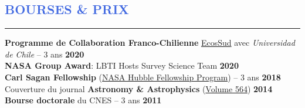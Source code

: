 \documentclass[11pt, a4paper, french]{article}
\begin{document}

\vspace{-0.3cm}
\textcolor{RoyalBlue}{\section{\large BOURSES \& PRIX}
\vspace{-0.2cm}\hrule}
\vspace{0.4cm}

\textbf{Programme de Collaboration Franco-Chilienne} \href{https://www.univ-paris13.fr/ecos-sud/}{EcosSud} avec {\it Universidad de Chile} -- 3 ans \hfill   \textbf{2020}\\ %

\vspace{-0.15cm}
\textbf{NASA Group Award}: LBTI Hosts Survey Science Team \hfill   \textbf{2020}\\ 

\vspace{-0.15cm}
\textbf{Carl Sagan Fellowship} (\href{http://www.stsci.edu/stsci-research/fellowships/nasa-hubble-fellowship-program}{NASA Hubble Fellowship Program}) -- 3 ans \hfill   { \bf 2018}\\

\vspace{-0.15cm}
Couverture du journal \textbf{Astronomy \& Astrophysics} (\href{https://www.aanda.org/articles/aa/abs/2014/04/contents/contents.html}{Volume 564}) \hfill  { \bf 2014}\\


\vspace{-0.15cm}
\textbf{Bourse doctorale} du CNES -- 3 ans \hfill   { \bf 2011}\\


\end{document}
